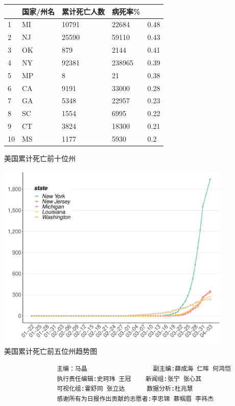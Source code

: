 \documentclass[]{article}
\begin{document}
\begin{figure}
    \begin{minipage}[H]{0.5\linewidth}
    \centering
        \begin{tabular}{@{}lllll@{}}
        \toprule
           & 国家/州名 & 累计死亡⼈数 & 病死率\%  &      \\ \midrule
        1  & MI    & 10791  & 22684  & 0.48 \\
        2  & NJ    & 25590  & 59110  & 0.43 \\
        3  & OK    & 879    & 2144   & 0.41 \\
        4  & NY    & 92381  & 238965 & 0.39 \\
        5  & MP    & 8      & 21     & 0.38 \\
        6  & CA    & 9191   & 33000  & 0.28 \\
        7  & GA    & 5348   & 22957  & 0.23 \\
        8  & SC    & 1554   & 6995   & 0.22 \\
        9  & CT    & 3824   & 18300  & 0.21 \\
        10 & MS    & 1177   & 5930   & 0.2  \\ \bottomrule
        \end{tabular}
        \makeatletter{}\makeatother\caption{美国累计死亡前十位州}
    \end{minipage}%
    \begin{minipage}[H]{0.5\linewidth}
    \centering
    \includegraphics[]{./input/table_plot/covid8.pdf}
    \caption{美国累计死亡前五位州趋势图}
    \end{minipage}
\end{figure}

\begin{verbatim}
                    主编：马晶                  副主编:薛成海 仁晖 何鸿恺
                    执行责任编辑:史珂玮 王冠    新闻组:张宁 张心其
                    可视化组:霍舒同 张立达      数据分析:杜兆慧
                    感谢所有为日报作出贡献的志愿者:李忠锦 慕帼眉 李祎杰
\end{verbatim}
\end{document}
